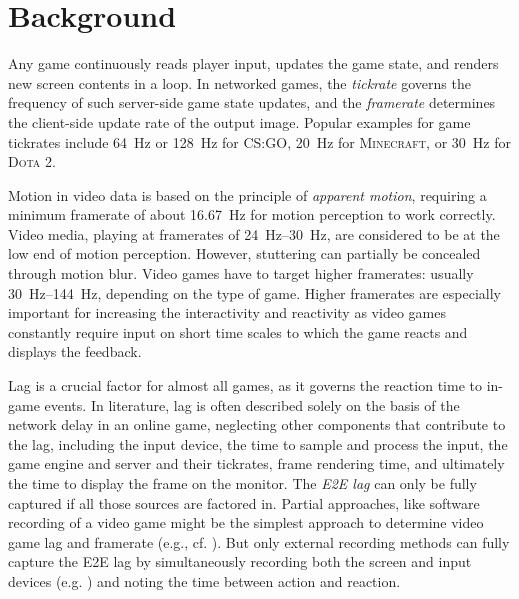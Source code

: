 \section{Background}
\label{sec:background}

Any game continuously reads player input, updates the game state, and renders new screen contents in a loop. In networked games, the \textit{tickrate} governs the frequency of such server-side game state updates, and the \textit{framerate} determines the client-side update rate of the output image. Popular examples for game tickrates include \SI{64}{\hertz} or \SI{128}{\hertz} for \textsc{CS:GO}, \SI{20}{\hertz} for \textsc{Minecraft}, or \SI{30}{\hertz} for \textsc{Dota 2}.

Motion in video data is based on the principle of \textit{apparent motion}, requiring a minimum framerate of about \SI{16.67}{\hertz} for motion perception to work correctly. Video media, playing at framerates of \SIrange{24}{30}{\hertz}, are considered to be at the low end of motion perception. However, stuttering can partially be concealed through motion blur. Video games have to target higher framerates: usually \SIrange{30}{144}{\hertz}, depending on the type of game. Higher framerates are especially important for increasing the interactivity and reactivity as video games constantly require input on short time scales to which the game reacts and displays the feedback.

Lag is a crucial factor for almost all games, as it governs the reaction time to in-game events. In literature, lag is often described solely on the basis of the network delay in an online game, neglecting other components that contribute to the lag, including the input device, the time to sample and process the input, the game engine and server and their tickrates, frame rendering time, and ultimately the time to display the frame on the monitor. The \textit{\gls{E2E} lag} can only be fully captured if all those sources are factored in. Partial approaches, like software recording of a video game might be the simplest approach to determine video game lag and framerate (e.g., cf. \cite{Chen:2011:MLC:2072298.2071991}). 
But only external recording methods can fully capture the \gls{E2E} lag by simultaneously recording both the screen and input devices (e.g. \cite{beyermethod}) and noting the time between action and reaction.
